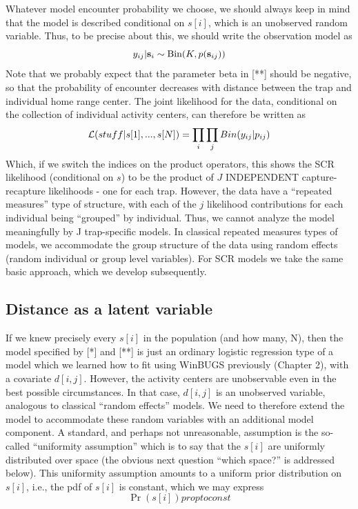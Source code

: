 Whatever model encounter probability we choose, we should always keep in mind that the model is described conditional on $s[i]$, which is an unobserved random variable.  Thus, to be precise about this, we should write the observation model as
\[
y_{ij}|{\bf s}_{i} \sim \mbox{Bin}(K, p({\bf s}_{ij}))
\]
Note that we probably expect that the parameter beta in [**] should be negative, so that the probability of encounter decreases with distance between the trap and individual home range center.  The joint likelihood for the data, conditional on the collection of individual activity centers, can therefore be written as
\[
{\cal L}(stuff|s[1],...,s[N]) =  \prod_{i} \prod_{j} Bin(y_{ij}|p_{ij})
\]
Which, if we switch the indices on the product operators, this shows the SCR likelihood (conditional on $s$) to be the product of $J$ INDEPENDENT capture-recapture likelihoods - one for each trap.  However, the data have a ``repeated measures'' type of structure, with each of the $j$ likelihood contributions for each individual being ``grouped'' by individual. Thus, we cannot analyze the model meaningfully by J trap-specific models. In classical repeated measures types of models, we accommodate the group structure of the data using random effects (random individual or group level variables). For SCR models we take the same basic approach, which we develop subsequently.

\subsection{Distance as a latent variable}
	
If we knew precisely every $s[i]$ in the population (and how many, N), then the model specified by [*] and [**] is just an ordinary logistic regression type of a model which we learned how to fit using WinBUGS previously (Chapter 2), with a covariate $d[i,j]$. However, the activity centers are unobservable even in the best possible circumstances. In that case, $d[i,j]$ is an unobserved variable, analogous to classical ``random effects'' models. We need to therefore extend the model to accommodate these random variables with an additional model component. A standard, and perhaps not unreasonable, assumption is the so-called ``uniformity assumption'' which is to say that the $s[i]$ are uniformly distributed over space (the obvious next question ``which space?'' is addressed below).  This uniformity assumption amounts to a uniform prior distribution on $s[i]$, i.e., the pdf of $s[i]$ is constant, which we may express
\begin{equation}
	\Pr(s[i]) propto const	
\label{eq.3stars}				
\end{equation}


